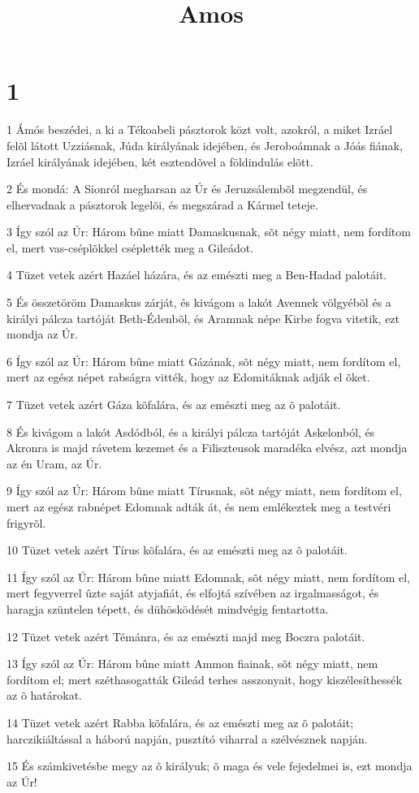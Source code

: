 

\title{Amos}


\chapter{1}

\par 1 Ámós beszédei, a ki a Tékoabeli pásztorok közt volt, azokról, a miket Izráel felõl látott  Uzziásnak, Júda királyának idejében, és Jeroboámnak a Jóás fiának, Izráel királyának idejében, két esztendõvel a földindulás elõtt.
\par 2 És mondá: A Sionról megharsan az Úr és Jeruzsálembõl megzendül, és elhervadnak a pásztorok legelõi, és megszárad a Kármel teteje.
\par 3 Így szól az Úr: Három bûne miatt Damaskusnak, sõt négy miatt, nem fordítom el, mert vas-cséplõkkel cséplették meg a Gileádot.
\par 4 Tüzet vetek azért Hazáel házára, és az emészti meg a Ben-Hadad palotáit.
\par 5 És összetöröm Damaskus zárját, és kivágom a lakót Avennek völgyébõl és a királyi pálcza tartóját Beth-Édenbõl, és Aramnak népe Kirbe fogva vitetik, ezt mondja az Úr.
\par 6 Így szól az Úr: Három bûne miatt Gázának, sõt négy miatt, nem fordítom el, mert az egész népet rabságra vitték, hogy az Edomitáknak adják el õket.
\par 7 Tüzet vetek azért Gáza kõfalára, és az emészti meg az õ palotáit.
\par 8 És kivágom a lakót Asdódból, és a királyi pálcza tartóját Askelonból, és Akronra is majd rávetem kezemet és a Filiszteusok maradéka elvész, azt mondja az én Uram, az Úr.
\par 9 Így szól az Úr: Három bûne miatt Tírusnak, sõt négy miatt, nem fordítom el, mert az egész rabnépet Edomnak adták át, és nem emlékeztek meg a testvéri  frigyrõl.
\par 10 Tüzet vetek azért Tírus kõfalára, és az emészti meg az õ palotáit.
\par 11 Így szól az Úr: Három bûne miatt Edomnak, sõt négy miatt, nem fordítom el, mert fegyverrel ûzte saját atyjafiát, és elfojtá szívében az irgalmasságot, és haragja szüntelen tépett, és dühösködését mindvégig fentartotta.
\par 12 Tüzet vetek azért Témánra, és az emészti majd meg Boczra palotáit.
\par 13 Így szól az Úr: Három bûne miatt Ammon fiainak, sõt négy miatt, nem fordítom el; mert széthasogatták Gileád terhes asszonyait, hogy kiszélesíthessék az õ határokat.
\par 14 Tüzet vetek azért Rabba kõfalára, és az emészti meg az õ palotáit; harczikiáltással a háború napján, pusztító viharral a szélvésznek napján.
\par 15 És számkivetésbe megy az õ királyuk; õ maga és vele fejedelmei is, ezt mondja az Úr!


